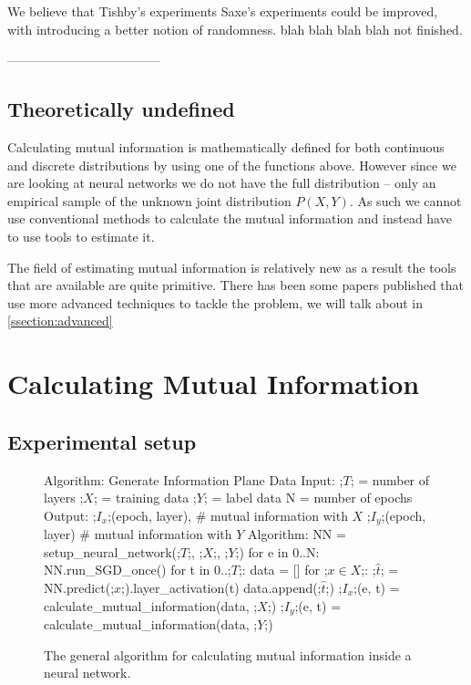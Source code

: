 \documentclass[dissertation.tex]{subfiles}
\begin{document}
We believe that Tishby's experiments Saxe's experiments could be improved, with
introducing a better notion of randomness. blah blah blah blah not finished.


------------------------------------



\subsection{Theoretically undefined}

Calculating mutual information is mathematically defined for both continuous and
discrete distributions by using one of the functions above. However since we are
looking at neural networks we do not have the full distribution -- only an
empirical sample of the unknown joint distribution $ P(X,Y) $. As such we cannot
use conventional methods to calculate the mutual information and instead have to
use tools to estimate it.

The field of estimating mutual information is relatively new as a result the
tools that are available are quite primitive. There has been some papers
published that use more advanced techniques to tackle the problem, we will talk
about in \autoref{ssection:advanced}

\section{Calculating Mutual Information}

\subsection{Experimental setup}

\begin{figure}[H]
    \begin{pythonfigure}
      Algorithm: Generate Information Plane Data
      Input:
      ;$T$; = number of layers
      ;$X$; = training data
      ;$Y$; = label data
      N = number of epochs
      Output: 
      ;$I_x$;(epoch, layer), # mutual information with $X$ 
      ;$I_y$;(epoch, layer)  # mutual information with $Y$ 
      Algorithm:
      NN = setup_neural_network(;$T$;, ;$X$;, ;$Y$;)
      for e in 0..N:
        NN.run_SGD_once()
        for t in 0..;$T$;:
          data = []
          for ;$x \in X$;:
            ;$\hat{t}$; = NN.predict(;$x$;).layer_activation(t)
            data.append(;$\hat{t}$;)
          ;$I_x$;(e, t) = calculate_mutual_information(data, ;$X$;)
          ;$I_y$;(e, t) = calculate_mutual_information(data, ;$Y$;)
    \end{pythonfigure}
    \caption{The general algorithm for calculating mutual information inside a
    neural network.}
    \label{fig:general}
\end{figure}
\end{document}
